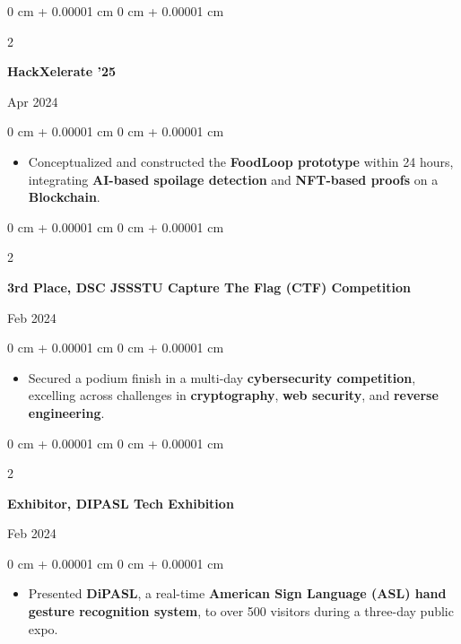\documentclass[10pt, letterpaper]{article}
\newenvironment{highlights}{
    \begin{itemize}[
        topsep=0.10 cm,
        parsep=0.10 cm,
        partopsep=0pt,
        itemsep=0pt,
        leftmargin=0 cm + 10pt
    ]
}{
    \end{itemize}
} %
\newenvironment{onecolentry}{
    \begin{adjustwidth}{
        0 cm + 0.00001 cm
    }{
        0 cm + 0.00001 cm
    }
}{
    \end{adjustwidth}
} %
\newenvironment{twocolentry}[2][]{
    \onecolentry
    \def\secondColumn{#2}
    \setcolumnwidth{\fill, 4.5 cm}
    \begin{paracol}{2}
}{
    \switchcolumn \raggedleft \secondColumn
    \end{paracol}
    \endonecolentry
} %
\begin{document}
\vspace{0.2 cm}

\begin{twocolentry}{
    Apr 2024
}
    \textbf{\textcolor{blueHighlight}{HackXelerate '25}}
\end{twocolentry}

\vspace{0.05 cm}
\begin{onecolentry}
    \begin{highlights}
        \item Conceptualized and constructed the \textbf{FoodLoop prototype} within 24 hours, integrating \textbf{AI-based spoilage detection} and \textbf{NFT-based proofs} on a \textbf{Blockchain}.
    \end{highlights}
\end{onecolentry}

\vspace{0.2 cm}

\begin{twocolentry}{
    Feb 2024
}
    \textbf{\textcolor{blueHighlight}{3rd Place, DSC JSSSTU Capture The Flag (CTF) Competition}}
\end{twocolentry}

\vspace{0.05 cm}
\begin{onecolentry}
    \begin{highlights}
        \item Secured a podium finish in a multi-day \textbf{cybersecurity competition}, excelling across challenges in \textbf{cryptography}, \textbf{web security}, and \textbf{reverse engineering}.
    \end{highlights}
\end{onecolentry}

\vspace{0.2 cm}

\begin{twocolentry}{
    Feb 2024
}
    \textbf{\textcolor{blueHighlight}{Exhibitor, DIPASL Tech Exhibition}}
\end{twocolentry}

\vspace{0.05 cm}
\begin{onecolentry}
    \begin{highlights}
        \item Presented \textbf{DiPASL}, a real-time \textbf{American Sign Language (ASL) hand gesture recognition system}, to over 500 visitors during a three-day public expo.
    \end{highlights}
\end{onecolentry}
\end{document}
